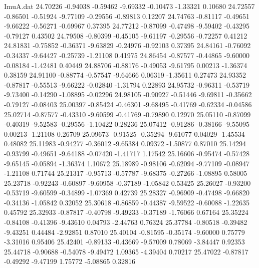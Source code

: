 \begin{filecontents}{ImuA.dat}
  24.70226   -0.94038   -0.59462   -9.69332   -0.10473   -1.33321    0.10680
  24.72557   -0.86501   -0.51924   -9.77109   -0.29556   -0.89813    0.12207
  24.74763   -0.81117   -0.49651   -9.66222   -0.56271   -0.69967    0.37395
  24.77212   -0.87099   -0.47498   -9.59402   -0.43295   -0.79127    0.43502
  24.79508   -0.80399   -0.45105   -9.61197   -0.29556   -0.72257    0.41212
  24.81831   -0.75852   -0.36371   -9.63829   -0.24976   -0.92103    0.37395
  24.84161   -0.76092   -0.34337   -9.64427   -0.25739   -1.21108    0.41975
  24.86454   -0.87577   -0.44865   -9.60000   -0.08184   -1.42481    0.40449
  24.88706   -0.88176   -0.49053   -9.61795    0.00213   -1.36374    0.38159
  24.91100   -0.88774   -0.57547   -9.64666    0.06319   -1.35611    0.27473
  24.93352   -0.87817   -0.55513   -9.66222   -0.02840   -1.31794    0.22893
  24.95732   -0.96311   -0.53719   -9.73400   -0.14290   -1.08895   -0.02296
  24.98105   -0.90927   -0.51446   -9.69811   -0.35662   -0.79127   -0.08403
  25.00397   -0.85424   -0.46301   -9.68495   -0.41769   -0.62334   -0.04586
  25.02714   -0.87577   -0.43310   -9.60599   -0.41769   -0.79890    0.12970
  25.05110   -0.87099   -0.40319   -9.52583   -0.29556   -1.10422    0.28236
  25.07412   -0.91286   -0.38166   -9.55095    0.00213   -1.21108    0.26709
  25.09673   -0.91525   -0.35294   -9.61077    0.04029   -1.45534    0.48082
  25.11983   -0.94277   -0.36012   -9.65384    0.09372   -1.50877    0.87010
  25.14294   -0.93799   -0.49651   -9.64188   -0.07420   -1.41717    1.17542
  25.16606   -0.95474   -0.57428   -9.65145   -0.05894   -1.36374    1.10672
  25.18989   -0.98106   -0.62094   -9.77109   -0.08947   -1.21108    0.71744
  25.21317   -0.95713   -0.57787   -9.68375   -0.27266   -1.08895    0.58005
  25.23718   -0.92243   -0.60897   -9.60958   -0.37189   -1.05842    0.53425
  25.26027   -0.93200   -0.53719   -9.60599   -0.34899   -1.07369    0.42739
  25.28327   -0.96909   -0.47498   -9.66820   -0.34136   -1.05842    0.32052
  25.30618   -0.86859   -0.44387   -9.59522   -0.60088   -1.22635    0.45792
  25.32933   -0.87817   -0.40798   -9.49233   -0.37189   -1.76066    0.67164
  25.35224   -0.84108   -0.41396   -9.43610    0.04793   -2.44763    0.76324
  25.37784   -0.80518   -0.39482   -9.43251    0.44484   -2.92851    0.87010
  25.40104   -0.81595   -0.35174   -9.60000    0.75779   -3.31016    0.95406
  25.42401   -0.89133   -0.43669   -9.57009    0.78069   -3.84447    0.92353
  25.44718   -0.90688   -0.54078   -9.49472    1.09365   -4.39404    0.70217
  25.47022   -0.87817   -0.49292   -9.47199    1.75772   -5.08865    0.32816

\end{filecontents}
